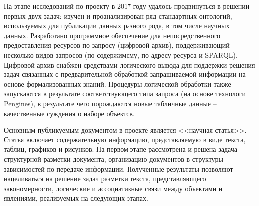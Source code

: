 \documentclass[a4paper,12pt,openany,final]{extreport}
\begin{document}
На этапе исследований по проекту в 2017 году удалось продвинуться в решении первых двух задач: изучен и проанализирован ряд стандартных онтологий, используемых для публикации данных разного рода, в том числе научных данных. Разработано программное обеспечение для непосредственного предоставления ресурсов по запросу (цифровой архив), поддерживающий несколько видов запросов (по содержимому, по адресу ресурса и SPARQL). Цифровой архив снабжен средствами логического вывода для поддержки решения задач связанных с предварительной обработкой запрашиваемой информации на основе формализованных знаний. Процедуры логической обработки также запускаются в результате соответствующего типа запроса (на основе технологи Pengines), в результате чего порождаются новые табличные данные -- качественные суждения о наборе объектов.

Основным публикуемым документом в проекте является <<научная статья>>.  Статья включает содержательную информацию, представляемую в виде текста, таблиц, графиков и рисунков. На первом этапе рассмотрена и решена задача структурной разметки документа, организацию документов в структуры зависимостей по передаче информации. Полученные результаты позволяют нацеливаться на решение задач разметки текста, представляющего закономерности, логические и ассоциативные связи между объектами и явлениями, реализуемых на следующих этапах.
\end{document}
